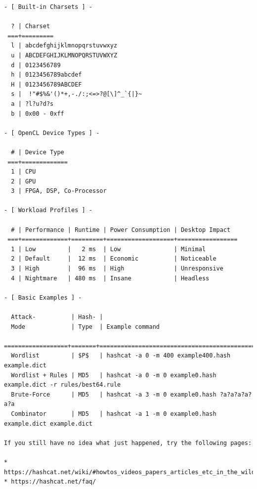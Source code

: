 \documentclass{article}
\begin{document}
\begin{lstlisting}
- [ Built-in Charsets ] -

  ? | Charset
 ===+=========
  l | abcdefghijklmnopqrstuvwxyz
  u | ABCDEFGHIJKLMNOPQRSTUVWXYZ
  d | 0123456789
  h | 0123456789abcdef
  H | 0123456789ABCDEF
  s |  !"#$%&'()*+,-./:;<=>?@[\]^_`{|}~
  a | ?l?u?d?s
  b | 0x00 - 0xff

- [ OpenCL Device Types ] -

  # | Device Type
 ===+=============
  1 | CPU
  2 | GPU
  3 | FPGA, DSP, Co-Processor

- [ Workload Profiles ] -

  # | Performance | Runtime | Power Consumption | Desktop Impact
 ===+=============+=========+===================+=================
  1 | Low         |   2 ms  | Low               | Minimal
  2 | Default     |  12 ms  | Economic          | Noticeable
  3 | High        |  96 ms  | High              | Unresponsive
  4 | Nightmare   | 480 ms  | Insane            | Headless

- [ Basic Examples ] -

  Attack-          | Hash- |
  Mode             | Type  | Example command
 ==================+=======+==================================================================
  Wordlist         | $P$   | hashcat -a 0 -m 400 example400.hash example.dict
  Wordlist + Rules | MD5   | hashcat -a 0 -m 0 example0.hash example.dict -r rules/best64.rule
  Brute-Force      | MD5   | hashcat -a 3 -m 0 example0.hash ?a?a?a?a?a?a
  Combinator       | MD5   | hashcat -a 1 -m 0 example0.hash example.dict example.dict

If you still have no idea what just happened, try the following pages:

* https://hashcat.net/wiki/#howtos_videos_papers_articles_etc_in_the_wild
* https://hashcat.net/faq/
\end{lstlisting}
\end{document}
